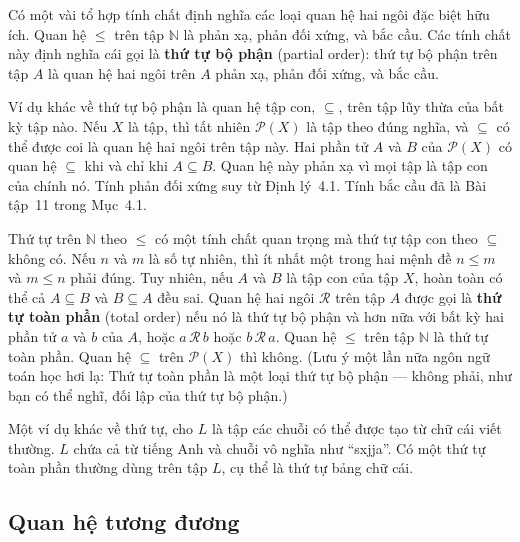 Có một vài tổ hợp tính chất định nghĩa các loại quan hệ hai ngôi đặc biệt hữu ích. Quan hệ $\le$ trên tập $\mathbb{N}$ là phản xạ, phản đối xứng, và bắc cầu. Các tính chất này định nghĩa cái gọi là \textbf{thứ tự bộ phận} (partial order): thứ tự bộ phận trên tập $A$ là quan hệ hai ngôi trên $A$ phản xạ, phản đối xứng, và bắc cầu.

Ví dụ khác về thứ tự bộ phận là quan hệ tập con, $\subseteq$, trên tập lũy thừa của bất kỳ tập nào. Nếu $X$ là tập, thì tất nhiên $\mathcal{P}(X)$ là tập theo đúng nghĩa, và $\subseteq$ có thể được coi là quan hệ hai ngôi trên tập này. Hai phần tử $A$ và $B$ của $\mathcal{P}(X)$ có quan hệ $\subseteq$ khi và chỉ khi $A \subseteq B$. Quan hệ này phản xạ vì mọi tập là tập con của chính nó. Tính phản đối xứng suy từ Định lý~4.1. Tính bắc cầu đã là Bài tập~11 trong Mục~4.1.

Thứ tự trên $\mathbb{N}$ theo $\le$ có một tính chất quan trọng mà thứ tự tập con theo $\subseteq$ không có. Nếu $n$ và $m$ là số tự nhiên, thì ít nhất một trong hai mệnh đề $n \le m$ và $m \le n$ phải đúng. Tuy nhiên, nếu $A$ và $B$ là tập con của tập $X$, hoàn toàn có thể cả $A \subseteq B$ và $B \subseteq A$ đều sai. Quan hệ hai ngôi $\mathcal{R}$ trên tập $A$ được gọi là \textbf{thứ tự toàn phần} (total order) nếu nó là thứ tự bộ phận và hơn nữa với bất kỳ hai phần tử $a$ và $b$ của $A$, hoặc $a\,\mathcal{R}\,b$ hoặc $b\,\mathcal{R}\,a$. Quan hệ $\le$ trên tập $\mathbb{N}$ là thứ tự toàn phần. Quan hệ $\subseteq$ trên $\mathcal{P}(X)$ thì không. (Lưu ý một lần nữa ngôn ngữ toán học hơi lạ: Thứ tự toàn phần là một loại thứ tự bộ phận --- không phải, như bạn có thể nghĩ, đối lập của thứ tự bộ phận.)

Một ví dụ khác về thứ tự, cho $L$ là tập các chuỗi có thể được tạo từ chữ cái viết thường. $L$ chứa cả từ tiếng Anh và chuỗi vô nghĩa như ``sxjja''. Có một thứ tự toàn phần thường dùng trên tập $L$, cụ thể là thứ tự bảng chữ cái.

\subsection{Quan hệ tương đương}

